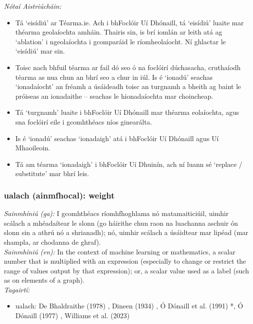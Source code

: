  \noindent \textit{Nótaí Aistriúcháin:}
\begin{itemize}
	\item Tá `eisídiú' ar Téarma.ie. Ach i bhFoclóir Uí Dhónaill, tá `eisídiú' luaite mar théarma geolaíochta amháin. Thairis sin, is brí iomlán ar leith atá ag `ablation' i ngeolaíochta i gcomparáid le ríomheolaíocht. Ní ghlactar le `eisídiú' mar sin.
	\item Toisc nach bhfuil téarma ar fail dó seo ó na foclóirí dúchasacha, cruthaíodh téarma as nua chun an bhrí seo a chur in iúl. Is é `ionadú' seachas `ionadaíocht' an fréamh a úsáideadh toisc an turgnamh a bheith ag baint le próiseas an ionadaithe -- seachas le hionadaíochta mar choincheap.
	\item Tá `turgnamh' luaite i bhFoclóir Uí Dhónaill mar théarma eolaíochta, agus sna foclóirí eile i gcomhthéacs níos ginearálta.
	\item Is é `ionadú' seachas `ionadaigh' atá i bhFoclóir Uí Dhónaill agus Uí Mhaoileoin.
	\item Tá am téarma `ionadaigh' i bhFoclóir Uí Dhuinín, ach ní luann sé `replace / substitute' mar bhrí leis.
\end{itemize}


\subsubsection*{ualach (ainmfhocal): weight}
 \noindent \textit{Sainmhíniú (ga):} I gcomhthéacs ríomhfhoghlama nó matamaiticiúil, uimhir scálach a mhéadaítear le slonn (go háirithe chun raon na luachanna aschuir ón slonn sin a athrú nó a shrianadh); nó, uimhir scálach a úsáidtear mar lipéad (mar shampla, ar chodanna de ghraf).
\\
 \noindent \textit{Sainmhíniú (en):} In the context of machine learning or mathematics, a scalar number that is multiplied with an expression (especially to change or restrict the range of values output by that expression); or, a scalar value used as a label (such as on elements of a graph).
\\
 \noindent \textit{Tagairtí:}
\begin{itemize}
	\item ualach: De Bhaldraithe (1978) \cite{de-bhaldraithe}, Dineen (1934) \cite{dineen}, Ó Dónaill et al. (1991) \cite{focloir-beag}*, Ó Dónaill (1977) \cite{odonaill}, Williams et al. (2023) \cite{storchiste}
\end{itemize}

